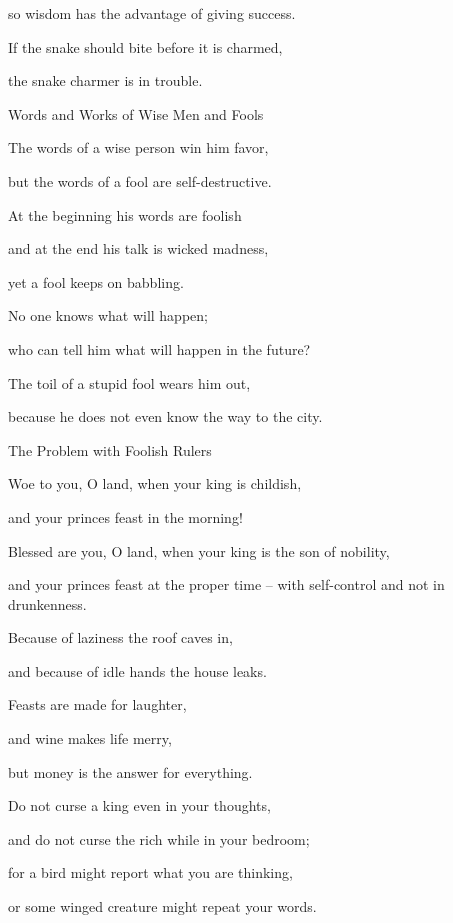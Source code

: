{\par }{\Q so wisdom
has the advantage of giving success.
\par }{\Q {}If
the snake
should bite
before it is charmed,
\par }{\Q the snake charmer is
in trouble.
\par }{\SH Words and Works of Wise Men and Fools
\par }{\Q {}The words
of a wise
person win him favor,
\par }{\Q but the words
of a fool
are self-destructive.
\par }{\Q {}At the beginning
his words
are foolish
\par }{\Q and at the end
his talk
is wicked
madness,
\par }{\Q {}yet a fool
keeps on babbling.
\par }{\Q No
one
knows
what
will happen;
\par }{\Q who can
tell
him what will happen
in the future?
\par }{\Q {}The toil
of a stupid fool
wears
him out,

\par }{\Q because he does not
even know
the way
to
the city.
\par }{\SH The Problem with Foolish Rulers
\par }{\Q {}Woe
to you, O land,
when your king
is childish,
\par }{\Q and your princes
feast
in the morning!
\par }{\Q {}Blessed
are you, O land,
when your king
is the son
of nobility,
\par }{\Q and your princes
feast
at the proper time –
with self-control
and not
in drunkenness.
\par }{\Q {}Because of laziness
the roof
caves in,
\par }{\Q and because of idle
hands
the house
leaks.
\par }{\Q {}Feasts
are made
for laughter,
\par }{\Q and wine
makes
life
merry,

\par }{\Q but money
is the answer
for everything.
\par }{\Q {}Do not
curse
a king
even
in your thoughts,
\par }{\Q and do not
curse
the rich
while in your bedroom;
\par }{\Q for
a bird
might report
what you are thinking,
\par }{\Q or some winged creature
might repeat
your words.

}
